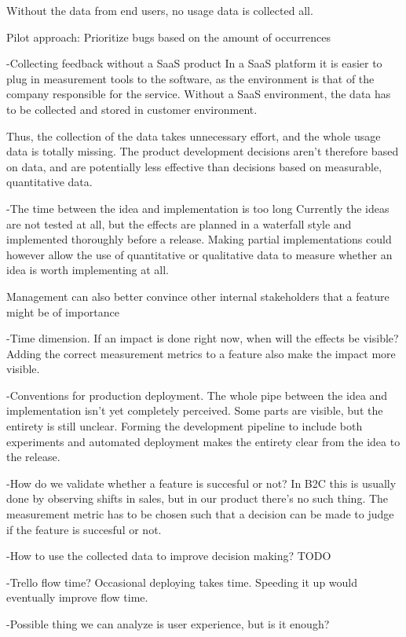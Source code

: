 \documentclass[english]{tktltiki2}
\theoremstyle{definition}
\theoremstyle{remark}
\begin{document}
  Without the data from end users, no usage data is collected all. 

  Pilot approach: Prioritize bugs based on the amount of occurrences

-Collecting feedback without a SaaS product
  In a SaaS platform it is easier to plug in measurement tools to the software, as the environment is that of the company responsible for the service. Without a SaaS environment, the data has to be collected and stored in customer environment. 

  Thus, the collection of the data takes unnecessary effort, and the whole usage data is totally missing. The product development decisions aren't therefore based on data, and are potentially less effective than decisions based on measurable, quantitative data.

-The time between the idea and implementation is too long
  Currently the ideas are not tested at all, but the effects are planned in a waterfall style and implemented thoroughly before a release. Making partial implementations could however allow the use of quantitative or qualitative data to measure whether an idea is worth implementing at all.

  Management can also better convince other internal stakeholders that a feature might be of importance

-Time dimension. If an impact is done right now, when will the effects be visible?
  Adding the correct measurement metrics to a feature also make the impact more visible.

-Conventions for production deployment. The whole pipe between the idea and implementation isn't yet completely perceived. Some parts are visible, but the entirety is still unclear.
  Forming the development pipeline to include both experiments and automated deployment makes the entirety clear from the idea to the release.

-How do we validate whether a feature is succesful or not? In B2C this is usually done by observing shifts in sales, but in our product there's no such thing.
  The measurement metric has to be chosen such that a decision can be made to judge if the feature is succesful or not.

-How to use the collected data to improve decision making?
  TODO

-Trello flow time?
  Occasional deploying takes time. Speeding it up would eventually improve flow time.

-Possible thing we can analyze is user experience, but is it enough?
\end{document}
